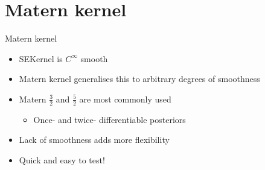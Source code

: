 \documentclass[presentation]{beamer}
\begin{document}
\section{Matern kernel}
\label{sec:orgfcf16e8}
\begin{frame}[label={sec:org317d848}]{Matern kernel}
\begin{itemize}
\item SEKernel is \(C^\infty\) smooth
\item Matern kernel generalises this to arbitrary degrees of smoothness
\item Matern \(\frac{3}{2}\) and \(\frac{5}{2}\) are most commonly used
\begin{itemize}
\item Once- and twice- differentiable posteriors
\end{itemize}
\item Lack of smoothness adds more flexibility
\item Quick and easy to test!
\end{itemize}
\end{frame}
\end{document}
